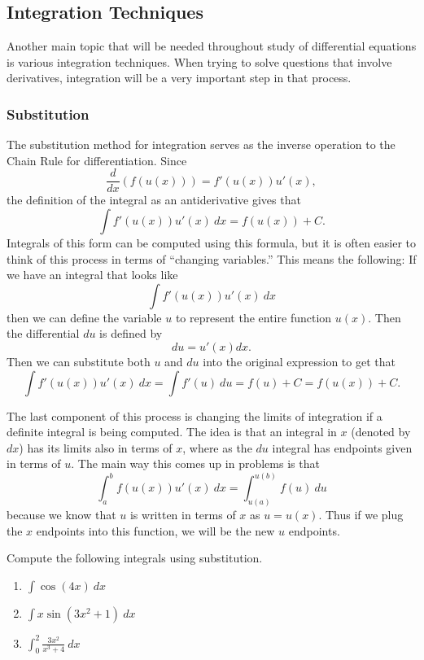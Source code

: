 \documentclass{ximera}
\begin{document}
\subsection{Integration Techniques}

Another main topic that will be needed throughout study of differential equations is various integration techniques. When trying to solve questions that involve derivatives, integration will be a very important step in that process.

\subsubsection{Substitution}

The substitution method for integration serves as the inverse operation to the Chain Rule for differentiation. Since 
\[ 
    \frac{d}{dx}(f(u(x))) = f'(u(x))u'(x), 
\] 
the definition of the integral as an antiderivative gives that
\[ 
    \int f'(u(x))u'(x)\ dx = f(u(x)) + C.
\] 
Integrals of this form can be computed using this formula, but it is often easier to think of this process in terms of ``changing variables.'' This means the following: If we have an integral that looks like 
\[ 
    \int f'(u(x))u'(x)\ dx 
\] 
then we can define the variable $u$ to represent the entire function $u(x)$. Then the differential $du$ is defined by 
\[ 
    du = u'(x) dx. 
\] 
Then we can substitute both $u$ and $du$ into the original expression to get that 
\[ 
    \int f'(u(x))u'(x)\ dx = \int f'(u)\ du = f(u) + C = f(u(x)) + C. 
\]

The last component of this process is changing the limits of integration if a definite integral is being computed. The idea is that an integral in $x$ (denoted by $dx$) has its limits also in terms of $x$, where as the $du$ integral has endpoints given in terms of $u$. The main way this comes up in problems is that
\[ 
    \int_a^b f(u(x))u'(x)\ dx = \int_{u(a)}^{u(b)} f(u)\ du
\] 
because we know that $u$ is written in terms of $x$ as $u = u(x)$. Thus if we plug the $x$ endpoints into this function, we will be the new $u$ endpoints.

\begin{example}
    Compute the following integrals using substitution.
    \begin{enumerate}
        \item $\displaystyle \int \cos(4x)\ dx$
        \item $\displaystyle \int x\sin(3x^2 + 1)\ dx$
        \item $\displaystyle \int_0^2 \frac{3x^2}{x^3 + 4}\ dx$ 
    \end{enumerate}
\end{example}
\end{document}
